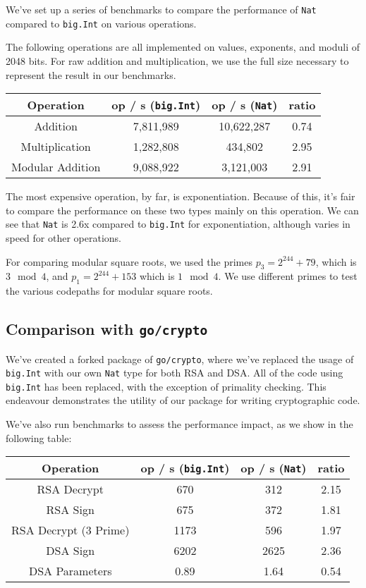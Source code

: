 \documentclass[11pt, a4paper]{article} %
\begin{document}
{We've set up a series of benchmarks to compare the performance
of \texttt{Nat} compared to \texttt{big.Int} on various operations.

The following operations are all implemented on values, exponents,
and moduli of 2048 bits. For raw addition and multiplication,
we use the full size necessary to represent the result in our benchmarks.

\begin{center}
 \begin{tabular}{|c | c | c | c|} 
 \hline
 Operation & op / s (\texttt{big.Int}) & op / s (\texttt{Nat}) & ratio \\ [0.5ex] 
 \hline\hline
 Addition & 7,811,989 & 10,622,287 & 0.74 \\
 \hline
 Multiplication & 1,282,808 & 434,802 & 2.95 \\
 \hline
 Modular Addition & 9,088,922 & 3,121,003 & 2.91 \\
 \hline
\end{tabular}
\end{center}

The most expensive operation, by far, is exponentiation. Because
of this, it's fair to compare the performance on these two types
mainly on this operation. We can see that \texttt{Nat} is 2.6x
compared to \texttt{big.Int} for exponentiation, although
varies in speed for other operations.

For comparing modular square roots, we used the primes
$p_3 = 2^{244} + 79$, which is $3 \mod 4$,
and $p_1 = 2^{244} + 153$ which is $1 \mod 4$. We use different primes
to test the various codepaths for modular square roots.

\subsection{Comparison with \texttt{go/crypto}}

We've created a forked package
\cite{meier_cronokirbyctcrypto_2021}
of \texttt{go/crypto}, where we've replaced the usage of \texttt{big.Int}
with our own \texttt{Nat} type for both RSA and DSA. All of the code
using \texttt{big.Int} has been replaced, with the exception of
primality checking. This endeavour demonstrates the utility of
our package for writing cryptographic code.

We've also run benchmarks to assess the performance impact, as we
show in the following table:

\begin{center}
 \begin{tabular}{|c | c | c | c|} 
 \hline
 Operation & op / s (\texttt{big.Int}) & op / s (\texttt{Nat}) & ratio \\ [0.5ex] 
 \hline\hline
 RSA Decrypt & 670 & 312 & 2.15 \\
 \hline
 RSA Sign & 675 & 372 & 1.81 \\
 \hline
 RSA Decrypt (3 Prime) & 1173 & 596 & 1.97 \\
 \hline
 DSA Sign & 6202 & 2625 & 2.36 \\
 \hline
 DSA Parameters & 0.89 & 1.64 & 0.54 \\
 \hline
\end{tabular}
\end{center}

}
\end{document}
